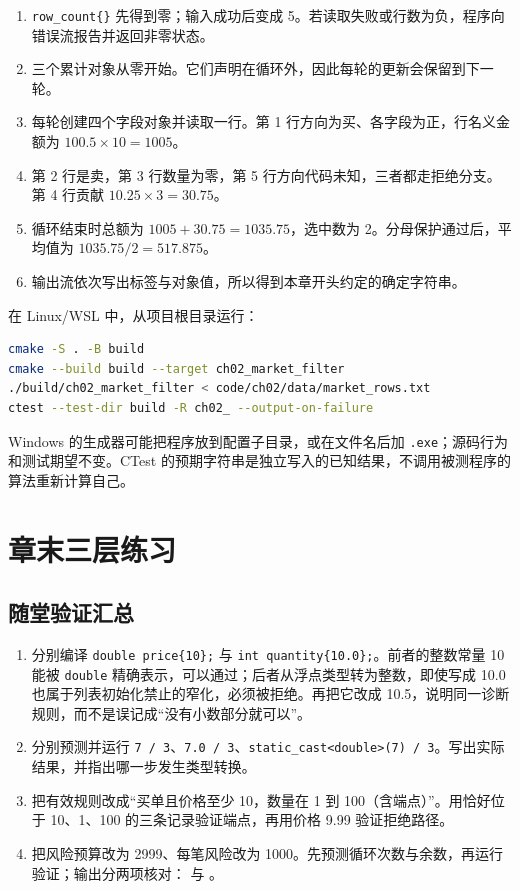 \begin{enumerate}
  \item \texttt{row\_count\{\}} 先得到零；输入成功后变成 5。若读取失败或行数为负，程序向错误流报告并返回非零状态。
  \item 三个累计对象从零开始。它们声明在循环外，因此每轮的更新会保留到下一轮。
  \item 每轮创建四个字段对象并读取一行。第 1 行方向为买、各字段为正，行名义金额为 $100.5\times10=1005$。
  \item 第 2 行是卖，第 3 行数量为零，第 5 行方向代码未知，三者都走拒绝分支。第 4 行贡献 $10.25\times3=30.75$。
  \item 循环结束时总额为 $1005+30.75=1035.75$，选中数为 2。分母保护通过后，平均值为 $1035.75/2=517.875$。
  \item 输出流依次写出标签与对象值，所以得到本章开头约定的确定字符串。
\end{enumerate}

在 Linux/WSL 中，从项目根目录运行：

\begin{lstlisting}[language=bash,numbers=none]
cmake -S . -B build
cmake --build build --target ch02_market_filter
./build/ch02_market_filter < code/ch02/data/market_rows.txt
ctest --test-dir build -R ch02_ --output-on-failure
\end{lstlisting}

Windows 的生成器可能把程序放到配置子目录，或在文件名后加 \texttt{.exe}；源码行为和测试期望不变。CTest 的预期字符串是独立写入的已知结果，不调用被测程序的算法重新计算自己。

\section{章末三层练习}

\subsection*{随堂验证汇总}

\begin{enumerate}
  \item 分别编译 \texttt{double price\{10\};} 与 \texttt{int quantity\{10.0\};}。前者的整数常量 10 能被 \texttt{double} 精确表示，可以通过；后者从浮点类型转为整数，即使写成 10.0 也属于列表初始化禁止的窄化，必须被拒绝。再把它改成 10.5，说明同一诊断规则，而不是误记成“没有小数部分就可以”。
  \item 分别预测并运行 \texttt{7 / 3}、\texttt{7.0 / 3}、\texttt{static\_cast<double>(7) / 3}。写出实际结果，并指出哪一步发生类型转换。
  \item 把有效规则改成“买单且价格至少 10，数量在 1 到 100（含端点）”。用恰好位于 10、1、100 的三条记录验证端点，再用价格 9.99 验证拒绝路径。
  \item 把风险预算改为 2999、每笔风险改为 1000。先预测循环次数与余数，再运行验证；输出分两项核对： 与 。
\end{enumerate}

